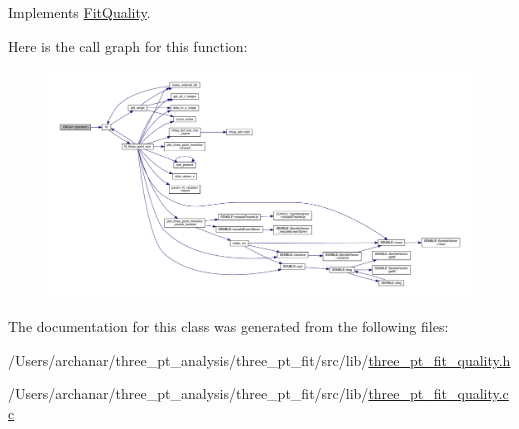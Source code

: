 Implements \mbox{\hyperlink{classFitQuality_a49a49e1206709d71c3ead41e981bb848}{Fit\+Quality}}.

Here is the call graph for this function\+:
\nopagebreak
\begin{figure}[H]
\begin{center}
\leavevmode
\includegraphics[width=350pt]{d5/d3e/classQNGen_a318c2cf305ceb9e81bef665364686408_cgraph}
\end{center}
\end{figure}


The documentation for this class was generated from the following files\+:\begin{DoxyCompactItemize}
\item 
/\+Users/archanar/three\+\_\+pt\+\_\+analysis/three\+\_\+pt\+\_\+fit/src/lib/\mbox{\hyperlink{src_2lib_2three__pt__fit__quality_8h}{three\+\_\+pt\+\_\+fit\+\_\+quality.\+h}}\item 
/\+Users/archanar/three\+\_\+pt\+\_\+analysis/three\+\_\+pt\+\_\+fit/src/lib/\mbox{\hyperlink{src_2lib_2three__pt__fit__quality_8cc}{three\+\_\+pt\+\_\+fit\+\_\+quality.\+cc}}\end{DoxyCompactItemize}

